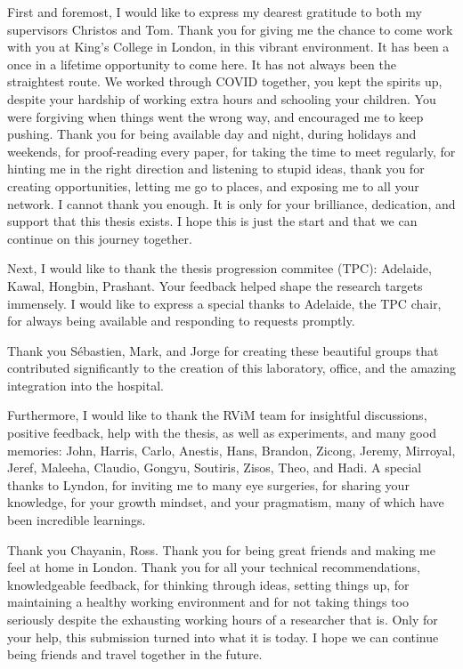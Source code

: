 First and foremost, I would like to express my dearest gratitude to both my supervisors Christos and Tom. Thank you for giving me the chance to come work with you at King's College in London, in this vibrant environment. It has been a once in a lifetime opportunity to come here. It has not always been the straightest route. We worked through COVID together, you kept the spirits up, despite your hardship of working extra hours and schooling your children. You were forgiving when things went the wrong way, and encouraged me to keep pushing. Thank you for being available day and night, during holidays and weekends, for proof-reading every paper, for taking the time to meet regularly, for hinting me in the right direction and listening to stupid ideas, thank you for creating opportunities, letting me go to places, and exposing me to all your network. I cannot thank you enough. It is only for your brilliance, dedication, and support that this thesis exists. I hope this is just the start and that we can continue on this journey together.

Next, I would like to thank the thesis progression commitee (TPC): Adelaide, Kawal, Hongbin, Prashant.  Your feedback helped shape the research targets immensely. I would like to express a special thanks to Adelaide, the TPC chair, for always being available and responding to requests promptly.

Thank you S\'{e}bastien, Mark, and Jorge for creating these beautiful groups that contributed significantly to the creation of this laboratory, office, and the amazing integration into the hospital.

Furthermore, I would like to thank the RViM team for insightful discussions, positive feedback, help with the thesis, as well as experiments, and many good memories: John, Harris, Carlo, Anestis, Hans, Brandon, Zicong, Jeremy, Mirroyal, Jeref, Maleeha, Claudio, Gongyu, Soutiris, Zisos, Theo, and Hadi. A special thanks to Lyndon, for inviting me to many eye surgeries, for sharing your knowledge, for your growth mindset, and your pragmatism, many of which have been incredible learnings.

Thank you Chayanin, Ross. Thank you for being great friends and making me feel at home in London. Thank you for all your technical recommendations, knowledgeable feedback, for thinking through ideas, setting things up, for maintaining a healthy working environment and for not taking things too seriously despite the exhausting working hours of a researcher that is. Only for your help, this submission turned into what it is today. I hope we can continue being friends and travel together in the future.

